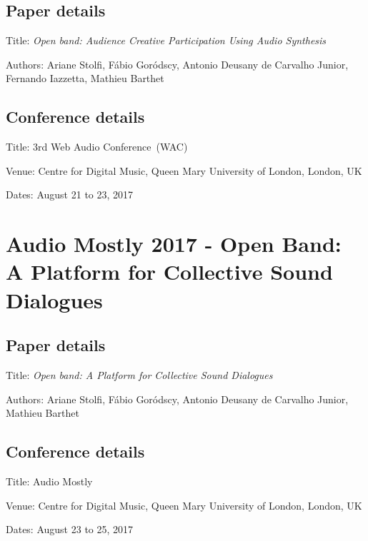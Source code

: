 \subsection*{Paper details}

Title: \textit{Open band: Audience Creative Participation Using Audio Synthesis}

Authors: Ariane Stolfi, Fábio Goródscy, Antonio Deusany de Carvalho Junior, Fernando Iazzetta, Mathieu Barthet

\subsection*{Conference details}

Title: 3rd Web Audio Conference~(WAC)

Venue: Centre for Digital Music, Queen Mary University of London, London, UK

Dates: August 21 to 23, 2017



\section{Audio Mostly 2017 - Open Band: A Platform for Collective Sound Dialogues}
\label{ape:paperam2017}

\subsection*{Paper details}

Title: \textit{Open band: A Platform for Collective Sound Dialogues}

Authors: Ariane Stolfi, Fábio Goródscy, Antonio Deusany de Carvalho Junior, Mathieu Barthet

\subsection*{Conference details}

Title: Audio Mostly

Venue: Centre for Digital Music, Queen Mary University of London, London, UK
 
Dates: August 23 to 25, 2017


